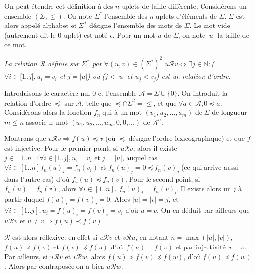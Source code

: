 \documentclass{scrartcl}
\begin{document}
			On peut étendre cet définition à des $n$-uplets de taille différente. Considérons un ensemble $(\Sigma,\leq)$.
			On note $\Sigma^*$ l'ensemble des $n$-uplets d'éléments de $\Sigma$. 
			$\Sigma$ est alors appelé alphabet et $\Sigma^*$ désigne l'ensemble des mots de $\Sigma$.
			Le mot vide (autrement dit le 0-uplet) est noté $\epsilon$.
			Pour un mot $u$ de $\Sigma$, on note $|u|$ la taille de ce mot.

			\prop \textsl{La relation $\mathcal{R}$ définie sur $\Sigma^*$ par $\forall (u,v)\in(\Sigma^*)^2$
			$u\mathcal{R}v \Leftrightarrow \exists j \in \mathbb{N}: $($\forall i \in [1..j[, u_i = v_i$ et $j=|u|$) ou 
			($j < |u|$ et $u_j < v_j$) est un relation d'ordre.}
			\begin{demo}
				\item Introduisons le caractère nul 0 et l'ensemble $\mathcal{A} = \Sigma \cup \{0\}$.
					On introduit la relation d'ordre $\preceq$ sur $\mathcal{A}$, telle que $\preceq\cap\Sigma^2 = \leq$, et 
					que $\forall a \in \mathcal{A}, 0 \preceq a$.
					Considérons alors la fonction $f_n$ qui à un mot $(u_1,u_2,...,u_m)$ de $\Sigma$ de longueur $m \leq n$ associe
					le mot $(u_1,u_2,...,u_m,0,0,...)$ de $\mathcal{A}^n$.
				\item Montrons que $u \mathcal{R}v \Rightarrow f(u) \preceq v$ (où $\preceq$ désigne l'ordre lexicographique) 
					et que $f$ est injective:
					Pour le premier point, si $u \mathcal{R} v$, alors il existe $j \in [1..n] : \forall i \in [1..j[, u_i = v_i$ et $j=|u|$,
					auquel cas $\forall i \in [1..n] f_n(u)_i = f_n(v_i)$ et $f_n(u)_j = 0 \preceq f_n(v)_j$ (ce qui arrive aussi dans l'autre cas)
					d'où $f_n(u) \preceq f_n(v)$.
					Pour le second point, si $f_n(u) = f_n(v)$, alors $\forall i \in [1..n]$, $f_n(u)_i = f_n(v)_i$.
					Il existe alors un $j$ à partir duquel $f(u)_i = f(v)_i = 0$. Alors $|u|=|v|=j$, 
					et $\forall i \in [1..j], u_i=f(u)_i = f(v)_i = v_i$ d'où $u=v$.
					On en déduit par ailleurs que $u\mathcal{R}v$ et $u\neq v \Rightarrow f(u) \prec f(v)$
				\item $\mathcal{R}$ est alors réflexive: en effet si $u\mathcal{R}v$ et $v\mathcal{R}u$,
					en notant $n=\max(|u|,|v|)$, $f(u) \preceq f(v)$ et $f(v) \preceq f(u)$ d'où $f(u)=f(v)$ et par injectivité 
					$u=v$. Par ailleurs, si $u\mathcal{R}v$ et $v\mathcal{R}w$, alors $f(u) \preceq f(v) \preceq f(w)$, d'où 
					$f(u) \preceq f(w)$. Alors par contraposée on a bien $u\mathcal{R}w$. 
			\end{demo}
\end{document}
